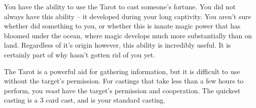 \documentclass[green]{NeptuneBall}
\begin{document}
\name{\gTarot{}}


You have the ability to use the Tarot to cast someone's fortune. You did not always have this ability -- it developed during your long captivity. You aren't sure whether \cWitch{} did something to you, or whether this is innate magic power that has bloomed under the ocean, where magic develops much more substantially than on land. Regardless of it's origin however, this ability is incredibly useful. It is certainly part of why \cWitch{} hasn't gotten rid of you yet.

The Tarot is a powerful aid for gathering information, but it is difficult to use without the target's permission. For castings that take less than a few hours to perform, you \emph{must} have the target's permission and cooperation. The quickest casting is a 3 card cast, and is your standard casting.\\
\end{document}
